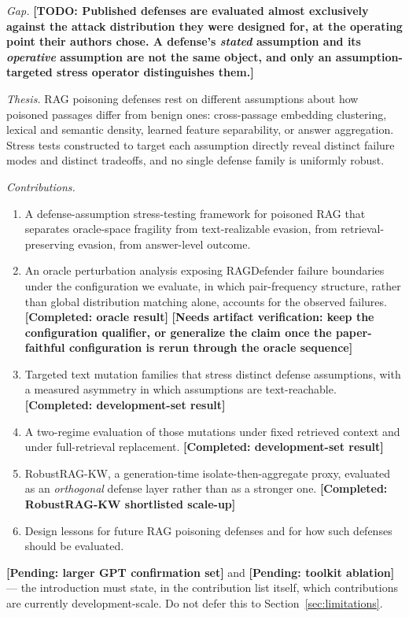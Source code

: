\documentclass[conference]{IEEEtran}
\newcommand{\COMPLETED}[1]{\textbf{[Completed: #1]}}
\newcommand{\PENDING}[1]{\textbf{[Pending: #1]}}
\newcommand{\VERIFY}[1]{\textbf{[Needs artifact verification: #1]}}
\newcommand{\TODO}[1]{\textbf{[TODO: #1]}}
\begin{document}
\textit{Gap.}
\TODO{Published defenses are evaluated almost exclusively against the attack
distribution they were designed for, at the operating point their authors chose.
A defense's \emph{stated} assumption and its \emph{operative} assumption are not
the same object, and only an assumption-targeted stress operator distinguishes
them.}

\textit{Thesis.}
RAG poisoning defenses rest on different assumptions about how poisoned passages
differ from benign ones: cross-passage embedding clustering, lexical and semantic
density, learned feature separability, or answer aggregation. Stress tests
constructed to target each assumption directly reveal distinct failure modes and
distinct tradeoffs, and no single defense family is uniformly robust.

\textit{Contributions.}
\begin{enumerate}
  \item A defense-assumption stress-testing framework for poisoned RAG that
        separates oracle-space fragility from text-realizable evasion, from
        retrieval-preserving evasion, from answer-level outcome.
  \item An oracle perturbation analysis exposing RAGDefender failure boundaries
        under the configuration we evaluate, in which pair-frequency structure,
        rather than global distribution matching alone, accounts for the observed
        failures. \COMPLETED{oracle result} \VERIFY{keep the configuration
        qualifier, or generalize the claim once the paper-faithful configuration
        is rerun through the oracle sequence}
  \item Targeted text mutation families that stress distinct defense assumptions,
        with a measured asymmetry in which assumptions are text-reachable.
        \COMPLETED{development-set result}
  \item A two-regime evaluation of those mutations under fixed retrieved context
        and under full-retrieval replacement. \COMPLETED{development-set result}
  \item RobustRAG-KW, a generation-time isolate-then-aggregate proxy, evaluated as
        an \emph{orthogonal} defense layer rather than as a stronger one.
        \COMPLETED{RobustRAG-KW shortlisted scale-up}
  \item Design lessons for future RAG poisoning defenses and for how such defenses
        should be evaluated.
\end{enumerate}
\PENDING{larger GPT confirmation set} and \PENDING{toolkit ablation} --- the
introduction must state, in the contribution list itself, which contributions are
currently development-scale. Do not defer this to Section~\ref{sec:limitations}.
\end{document}

